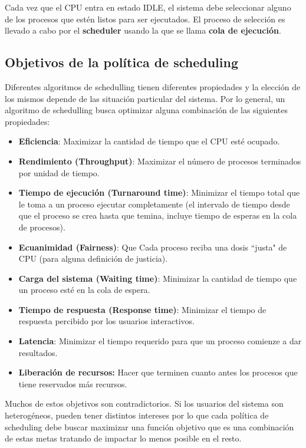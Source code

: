     Cada vez que el CPU entra en estado IDLE, el sistema debe seleccionar alguno de los procesos que estén listos para ser ejecutados. El proceso de selección es llevado a cabo por el \textbf{scheduler} usando la que se llama \textbf{cola de ejecución}.
    
    \subsection{Objetivos de la política de scheduling}
    Diferentes algoritmos de schedulling tienen diferentes propiedades y la elección de los mismos depende de las situación particular del sistema. Por lo general, un algoritmo de schedulling busca optimizar alguna combinación de las siguientes propiedades:
    
    \begin{itemize}
        \item \textbf{Eficiencia}: Maximizar la cantidad de tiempo que el CPU esté ocupado.
        \item \textbf{Rendimiento (Throughput)}: Maximizar el número de procesos terminados por unidad de tiempo.
        \item \textbf{Tiempo de ejecución (Turnaround time)}: Minimizar el tiempo total que le toma a un proceso ejecutar completamente (el intervalo de tiempo desde que el proceso se crea hasta que temina, incluye tiempo de esperas en la cola de procesos).
        \item \textbf{Ecuanimidad (Fairness)}: Que Cada proceso reciba una dosis ``justa" de CPU (para alguna definición de justicia).
        \item \textbf{Carga del sistema (Waiting time)}: Minimizar la cantidad de tiempo que un proceso esté en la cola de espera.
        \item \textbf{Tiempo de respuesta (Response time)}: Minimizar el tiempo de respuesta percibido por los usuarios interactivos.
        \item \textbf{Latencia}: Minimizar el tiempo requerido para que un proceso comienze a dar resultados.
        
        \item \textbf{Liberación de recursos:} Hacer que terminen cuanto antes los procesos que tiene reservados más recursos.
    \end{itemize}
    Muchos de estos objetivos son contradictorios. Si los usuarios del sistema son heterogéneos, pueden tener distintos intereses por lo que cada política de scheduling debe buscar maximizar una función objetivo que es una combinación de estas metas tratando de impactar lo menos posible en el resto.
    
